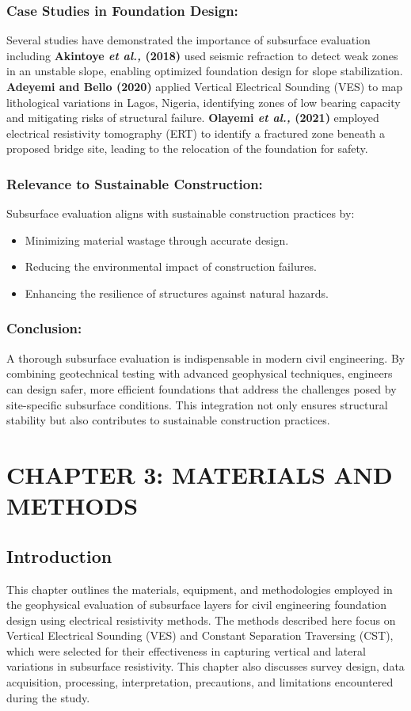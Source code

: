 \documentclass[12pt,a4paper]{report}
\begin{document}
\subsection{Case Studies in Foundation Design:}
Several studies have demonstrated the importance of subsurface evaluation including \textbf{Akintoye \textit{et al.,} (2018)} used seismic refraction to detect weak zones in an unstable slope, enabling optimized foundation design for slope stabilization. \textbf{Adeyemi and Bello (2020)} applied Vertical Electrical Sounding (VES) to map lithological variations in Lagos, Nigeria, identifying zones of low bearing capacity and mitigating risks of structural failure. \textbf{Olayemi \textit{et al.,} (2021)} employed electrical resistivity tomography (ERT) to identify a fractured zone beneath a proposed bridge site, leading to the relocation of the foundation for safety.


\subsection{Relevance to Sustainable Construction:}
Subsurface evaluation aligns with sustainable construction practices by:
\begin{itemize}
    \item Minimizing material wastage through accurate design.
    \item Reducing the environmental impact of construction failures.
    \item Enhancing the resilience of structures against natural hazards.
\end{itemize}

\subsection{Conclusion:}
A thorough subsurface evaluation is indispensable in modern civil engineering. By combining geotechnical testing with advanced geophysical techniques, engineers can design safer, more efficient foundations that address the challenges posed by site-specific subsurface conditions. This integration not only ensures structural stability but also contributes to sustainable construction practices.

\chapter{CHAPTER 3: MATERIALS AND METHODS}

\section{Introduction}
This chapter outlines the materials, equipment, and methodologies employed in the geophysical evaluation of subsurface layers for civil engineering foundation design using electrical resistivity methods. The methods described here focus on Vertical Electrical Sounding (VES) and Constant Separation Traversing (CST), which were selected for their effectiveness in capturing vertical and lateral variations in subsurface resistivity. This chapter also discusses survey design, data acquisition, processing, interpretation, precautions, and limitations encountered during the study.
\end{document}
